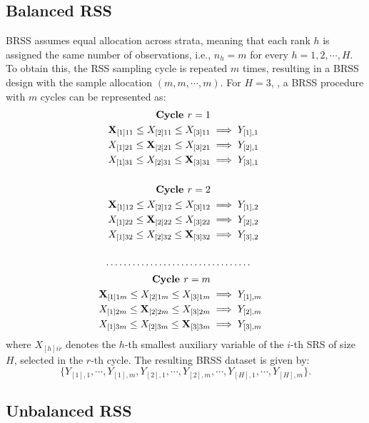 \subsection{Balanced RSS}

BRSS assumes equal allocation across strata, meaning that each rank $h$ is assigned the same number of observations, i.e., $n_h=m$ for every $h=1,2,\cdots, H$. To obtain this, the RSS sampling cycle is repeated $m$ times, resulting in a BRSS design with the sample allocation $(m, m, \cdots, m)$. For $H=3$, , a BRSS procedure with $m$ cycles can be represented as: 
\[
\begin{aligned}
\textbf{Cycle $r=1$} \\
{\bf X}_{[1]11} \leq X_{[2]11} \leq X_{[3]11} &\implies Y_{[1],1} \\
X_{[1]21} \leq {\bf X}_{[2]21} \leq X_{[3]21} &\implies Y_{[2],1} \\
X_{[1]31} \leq X_{[2]31} \leq {\bf X}_{[3]31} &\implies Y_{[3],1} \\
\\
\textbf{Cycle $r=2$} \\
{\bf X}_{[1]12} \leq X_{[2]12} \leq X_{[3]12} &\implies Y_{[1],2} \\
X_{[1]22} \leq {\bf X}_{[2]22} \leq X_{[3]22} &\implies Y_{[2],2} \\
X_{[1]32} \leq X_{[2]32} \leq {\bf X}_{[3]32} &\implies Y_{[3],2} \\
\\
\cdots \cdots \cdots \cdots \cdots \cdots \cdots \cdots & \cdots \cdots \cdots
\\
\textbf{Cycle $r=m$} \\
{\bf X}_{[1]1m} \leq X_{[2]1m} \leq X_{[3]1m} &\implies Y_{[1],m} \\
X_{[1]2m} \leq {\bf X}_{[2]2m} \leq X_{[3]2m} &\implies Y_{[2],m} \\
X_{[1]3m} \leq X_{[2]3m} \leq {\bf X}_{[3]3m} &\implies Y_{[3],m} \\
\end{aligned}
\]
where $X_{[h]ir}$ denotes the $h$-th smallest auxiliary variable of the $i$-th SRS of size $H$, selected in the $r$-th cycle.
The resulting BRSS dataset is given by:
\[\{Y_{[1],1},\cdots, Y_{[1],m}, Y_{[2],1}, \cdots, Y_{[2],m}, \cdots, Y_{[H],1},\cdots, Y_{[H],m}\}.\]

\subsection{Unbalanced RSS}

